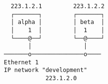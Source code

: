\documentclass[varwidth,crop]{standalone}
\begin{document}
\begin{verbatim}
  223.1.2.1         223.1.2.2
  ┌───────┐         ┌───────┐
  │ alpha │         │ beta  │
  │    1  │         │  1    │
  └────@──┘         └──@────┘
       │               │
───────o───────────────o────
Ethernet 1
IP network "development"
            223.1.2.0
\end{verbatim}
\end{document}
